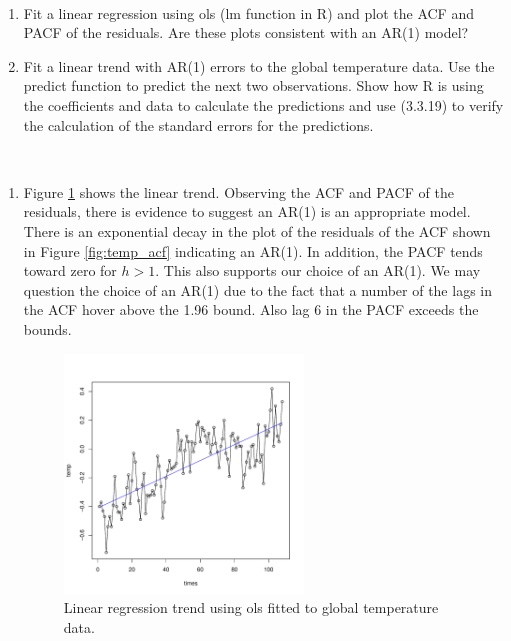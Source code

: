 \documentclass[12pt]{article}
\newenvironment{solution}[2][Solution]{\begin{trivlist}
	\item[\hskip \labelsep {\bfseries #1}]}{\end{trivlist}}
\newenvironment{problem}[2][Problem]{\begin{trivlist}
	\item[\hskip \labelsep {\bfseries #1}\hskip \labelsep {\bfseries #2.}]}{\end{trivlist}}
\begin{document}
	\begin{problem}{7}
	$ $
	\begin{enumerate}[label=(\alph*)]
		\item Fit a linear regression using ols (lm function in R) and plot the ACF and PACF of the residuals. Are these plots consistent with an AR(1) model?
		\item Fit a linear trend with AR(1) errors to the global temperature data. Use the predict function to predict the next two observations. Show how R is using the coefficients and data to calculate the predictions and use (3.3.19) to verify the calculation of the standard errors for the predictions. 
	\end{enumerate}
	\end{problem}
		
	\begin{solution}{}
	$ $
	\begin{enumerate}[label=(\alph*)]
		\item Figure \ref{fig:temp_ols} shows the linear trend. Observing the ACF and PACF of the residuals, there is evidence to suggest an AR(1) is an appropriate model. There is an exponential decay in the plot of the residuals of the ACF shown in Figure \ref{fig:temp_acf} indicating an AR(1). In addition, the PACF tends toward zero for $h>1$. This also supports our choice of an AR(1). We may question the choice of an AR(1) due to the fact that a number of the lags in the ACF hover above the 1.96 bound. Also lag 6 in the PACF exceeds the bounds.
		
		\begin{figure}[H]
    			\centering
    			\includegraphics[width=0.6\textwidth]{figs/problem_7/temp_ols.pdf}
    			\caption{Linear regression trend using ols fitted to global temperature data.}
    			\label{fig:temp_ols}
		\end{figure}
		

\end{enumerate}
\end{solution}
\end{document}
